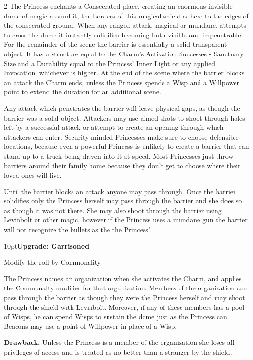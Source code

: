 \begin{multicols}{2}
\noindent The Princess enchants a Consecrated place, creating an enormous invisible dome of magic around it, the borders of this magical shield adhere to the edges of the consecrated ground. When any ranged attack, magical or mundane, attempts to cross the dome it instantly solidifies becoming both visible and impenetrable. For the remainder of the scene the barrier is essentially a solid transparent object. It has a structure equal to the Charm's Activation Successes - Sanctuary Size and a Durability equal to the Princess' Inner Light or any applied Invocation, whichever is higher. At the end of the scene where the barrier blocks an attack the Charm ends, unless the Princess spends a Wisp and a Willpower point to extend the duration for an additional scene. 

Any attack which penetrates the barrier will leave physical gaps, as though the barrier was a solid object. Attackers may use aimed shots to shoot through holes left by a successful attack or attempt to create an opening through which attackers can enter. Security minded Princesses make sure to choose defensible locations, because even a powerful Princess is unlikely to create a barrier that can stand up to a truck being driven into it at speed. Most Princesses just throw barriers around their family home because they don't get to choose where their loved ones will live. 

Until the barrier blocks an attack anyone may pass through. Once the barrier solidifies only the Princess herself may pass through the barrier and she does so as though it was not there. She may also shoot through the barrier using Levinbolt or other magic, however if the Princess uses a mundane gun the barrier will not recognize the bullets as the the Princess'. 

\begin{myindentpar}{10pt}\textbf{Upgrade: Garrisoned}

Modify the roll by Commonality

The Princess names an organization when she activates the Charm, and applies the Commonalty modifier for that organization. Members of the organization can pass through the barrier as though they were the Princess herself and may shoot through the shield with Levinbolt. Moreover, if any of these members has a pool of Wisps, he can spend Wisps to sustain the dome just as the Princess can. Beacons may use a point of Willpower in place of a Wisp. 

\textbf{Drawback:} Unless the Princess is a member of the organization she loses all privileges of access and is treated as no better than a stranger by the shield.


\end{myindentpar}
\end{multicols}

